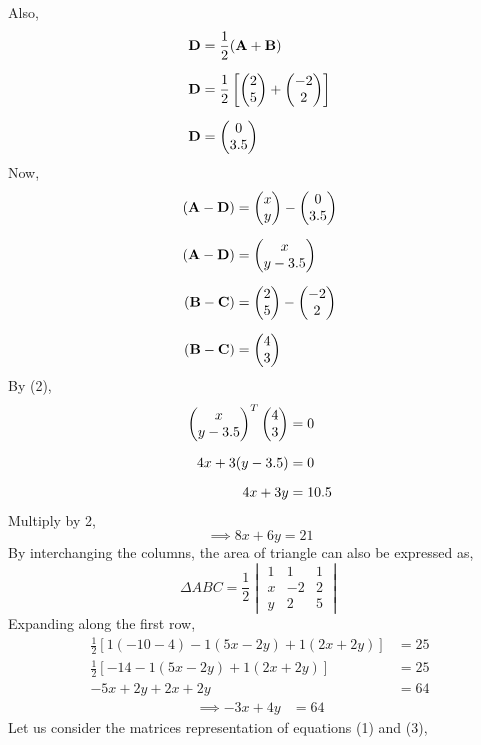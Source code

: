 \documentclass[journal,12pt,twocolumn]{IEEEtran}
\begin{document}
Also,
\begin{align*}
    \mathbf{D} &=\frac{1}{2}(\mathbf{A}+\mathbf{B}) \\[6pt]
    \mathbf{D} &=\frac{1}{2}\left[ \begin{pmatrix}2\\5\end{pmatrix} + \begin{pmatrix}-2\\2\end{pmatrix}\right] \\[6pt]
    \mathbf{D} &=\begin{pmatrix}0\\3.5\end{pmatrix} 
\end{align*}
Now,
\begin{align*}
    (\mathbf{A}-\mathbf{D}) &= \begin{pmatrix}x\\y\end{pmatrix}- \begin{pmatrix}0\\3.5\end{pmatrix} \\[6pt]
    (\mathbf{A}-\mathbf{D}) &= \begin{pmatrix}x\\y-3.5\end{pmatrix} \\[6pt]
    (\mathbf{B}-\mathbf{C}) &= \begin{pmatrix}2\\5\end{pmatrix}- \begin{pmatrix}-2\\2\end{pmatrix} \\[6pt]
    (\mathbf{B}-\mathbf{C}) &= \begin{pmatrix}4\\3\end{pmatrix}
\end{align*}
By (2),
\begin{align*}
{\ensuremath{\begin{pmatrix}x\\y-3.5\end{pmatrix}}}^T \begin{pmatrix}4\\3\end{pmatrix} &= 0 \\[6pt]
    4x+3(y-3.5) &= 0 \\[6pt]
    4x+3y &= 10.5
\end{align*}
Multiply by 2,
\begin{equation}
 \implies 8x+6y=21    
\end{equation}
\noindent
By interchanging the columns, the area of triangle can also be expressed as,
$$\Delta ABC=\frac{1}{2}\begin{vmatrix}
1 & 1 & 1\\ 
x & -2 & 2\\ 
y & 2 & 5
\end{vmatrix}$$
\noindent
Expanding along the first row,
\begin{align*}
\frac{1}{2}\left [ 1(-10-4)-1(5x-2y)+1(2x+2y) \right ] &= 25 \\
\frac{1}{2}\left [-14-1(5x-2y)+1(2x+2y) \right ] &= 25 \\
-5x+2y+2x+2y &= 64
\end{align*}
 \begin{align}
    \implies  -3x+4y &= 64   
 \end{align}
Let us consider the matrices representation of equations (1) and (3),
\end{document}
